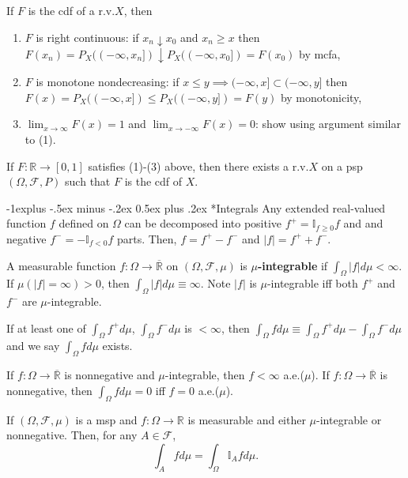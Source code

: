 \documentclass[paper=letter,fontsize=3mm]{scrartcl}
\makeatletter
\newcommand{\R}{\mathbb{R}}
\newcommand\indicate[1]{\mathbb{I}_{ #1 }}
\newcommand\abs[1]{\left| #1 \right|}
\renewcommand{\subsection}{\@startsection{subsection}{2}{0mm}%
                                {-1explus -.5ex minus -.2ex}%
                                {0.5ex plus .2ex}%
                                {\normalfont\normalsize\bfseries}}
\makeatother
\begin{document}
\begin{multicols*}{3}
If $F$ is the cdf of a r.v.\@ $X$, then 
\begin{enumerate}
\item $F$ is right continuous: if $x_n \downarrow x_0$ and $x_n \ge x$ then $F(x_n) = P_X((-\infty,x_n]) \downarrow P_X((-\infty,x_0]) = F(x_0)$ by mcfa,
\item $F$ is monotone nondecreasing: if $x \le y \implies (-\infty, x] \subset (-\infty, y]$ then $F(x) = P_X((-\infty,x]) \le P_X((-\infty,y]) =F(y)$ by monotonicity,
\item $\lim_{x\to\infty} F(x) = 1$ and $\lim_{x\to-\infty} F(x) = 0$: show using argument similar to (1).
\end{enumerate}

If $F: \R \to [0,1]$ satisfies (1)-(3) above, then there exists a r.v.\@ $X$ on a psp $(\Omega, \mathcal{F}, P)$ such that $F$ is the cdf of $X$. \\\medskip

\subsection*{Integrals}
Any extended real-valued function $f$ defined on $\Omega$ can be decomposed into positive $f^+ = \indicate{f\ge0}f$ and and negative $f^- = -\indicate{f<0}f$ parts. Then, $f = f^+ - f^-$ and $\abs{f} = f^+ + f^-$. \\\medskip

A measurable function $f: \Omega \to \overline{\R}$ on $(\Omega, \mathcal{F}, \mu)$ is \textbf{$\mu$-integrable} if $\int_\Omega \abs{f} d\mu < \infty$. If $\mu(\abs{f} = \infty) > 0$, then $\int_\Omega \abs{f} d\mu \equiv \infty$. Note $\abs{f}$ is $\mu$-integrable iff both $f^+$ and $f^-$ are $\mu$-integrable. \\\medskip

If at least one of $\int_\Omega f^+ d\mu$, $\int_\Omega f^- d\mu$ is $< \infty$, then $\int_\Omega f d\mu \equiv \int_\Omega f^+ d\mu - \int_\Omega f^- d\mu$ and we say $\int_\Omega f d\mu$ exists. \\\medskip

If $f: \Omega \to \overline{\R}$ is nonnegative and $\mu$-integrable, then $f < \infty$ a.e.($\mu$). If $f: \Omega \to \overline{\R}$ is nonnegative, then $\int_\Omega fd\mu = 0$ iff $f = 0$ a.e.($\mu$). \\\medskip

If $(\Omega, \mathcal{F}, \mu)$ is a msp and $f:\Omega \to \R$ is measurable and either $\mu$-integrable or nonnegative. Then, for any $A \in \mathcal{F}$, 
$$\int_A fd\mu = \int_\Omega \indicate{A}fd\mu.$$


\end{multicols*}
\end{document}
